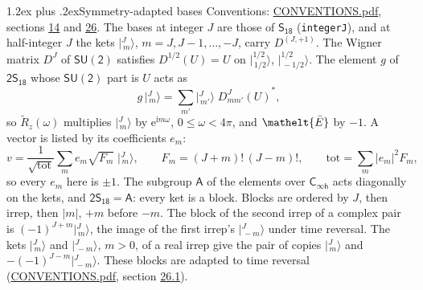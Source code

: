 \documentclass[10pt,a4paper]{article}
\makeatletter
\renewcommand\section{\@startsection{section}{1}{\z@}{-3ex plus -1ex minus -.2ex}%
  {1.2ex plus .2ex}{\normalfont\large\sffamily\bfseries\color{parttitle}}}
\numberwithin{equation}{section}
\newcommand{\eltfont}[1]{{\let\sigma\eltsigma\mathelt{#1}}}
\newcommand{\grp}[1]{\mathsf{#1}}
\newcommand{\elt}[1]{\eltfont{#1}}
\newcommand{\iunit}{\mathrm{i}}
\newcommand{\expe}{\mathrm{e}}
\newcommand{\irrJp}[2]{D^{(#1,#2)}}
\newcommand{\wignerD}[1]{D^{#1}}
\newcommand{\conj}[1]{{#1}^{*}}
\newcommand{\jm}[2]{\bigl\lvert{}^{#1}_{\,#2}\bigr\rangle}
\newcommand{\barred}[1]{\bar{#1}}
\newcommand{\lift}[1]{\tilde{#1}}
\makeatother
\begin{document}
\section{Symmetry-adapted bases}\label{s:bases}
Conventions: \href{../../CONVENTIONS.pdf}{CONVENTIONS.pdf}, sections \href{../../../rotation/CONVENTIONS.pdf\#conv.14}{14} and \href{../../CONVENTIONS.pdf\#conv.26}{26}.
\leavevmode\label{n:index.m}\label{n:vector.ket}The bases at integer $J$ are those of \href{../../../rotation/data/pdf/S18.pdf}{$\grp{S_{18}}$} (\texttt{integerJ}), and at half-integer $J$ the kets $\jm{J}{m}$, $m = J, J-1, \dots, -J$, carry $\irrJp{J}{+1}$. \label{n:matrix.wigner}The Wigner matrix $\wignerD{J}$ of $\grp{SU(2)}$ satisfies $\wignerD{1/2}(U) = U$ on $\jm{1/2}{1/2}$, $\jm{1/2}{-1/2}$. The element $g$ of $\grp{2S_{18}}$ whose $\grp{SU(2)}$ part is $U$ acts as
\begin{equation}\label{e:action}g\,\jm{J}{m} = \sum_{m'} \jm{J}{m'}\; \conj{\wignerD{J}_{m m'}(U)},\end{equation}
so $\lift{R}_{z}(\omega)$ multiplies $\jm{J}{m}$ by $\expe^{\iunit m\omega}$, $0 \le \omega < 4\pi$, and $\elt{\barred{E}}$ by $-1$. \label{n:index.ketcoefficient}\label{n:vector.basis.symmetry}\label{n:index.ketweight}\label{n:index.total}A vector is listed by its coefficients $e_m$:
\begin{equation}\label{e:ket}v = \frac{1}{\sqrt{\mathrm{tot}}}\sum_m e_m\sqrt{F_m}\;\jm{J}{m},\qquad F_m = (J+m)!\,(J-m)!,\qquad \mathrm{tot} = \sum_m |e_m|^2F_m,\end{equation}
so every $e_m$ here is $\pm 1$.
\leavevmode\label{n:group.A}The subgroup $\grp{A}$ of the elements over $\grp{C_{\infty h}}$ acts diagonally on the kets, and $\grp{2S_{18}} = \grp{A}$: every ket is a block. Blocks are ordered by $J$, then irrep, then $|m|$, $+m$ before $-m$. The block of the second irrep of a complex pair is $(-1)^{J+m}\jm{J}{m}$, the image of the first irrep's $\jm{J}{-m}$ under time reversal. The kets $\jm{J}{m}$ and $\jm{J}{-m}$, $m > 0$, of a real irrep give the pair of copies $\jm{J}{m}$ and $-(-1)^{J-m}\jm{J}{-m}$. These blocks are adapted to time reversal (\href{../../CONVENTIONS.pdf}{CONVENTIONS.pdf}, section \href{../../CONVENTIONS.pdf\#conv.26.1}{26.1}).
\end{document}
